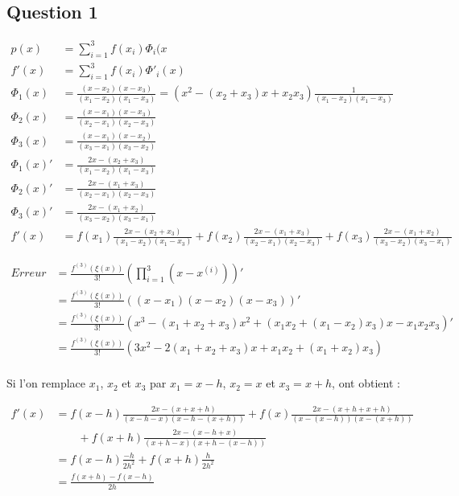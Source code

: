 \subsection{Question 1}

\begin{equation}
	\begin{aligned}
		p(x) &= \sum_{i=1}^{3}f(x_i)\Phi_i(x\\
		f'(x) &= \sum_{i=1}^{3}f(x_i)\Phi'_i(x)\\
		\Phi_1(x) &= \frac{(x-x_2)(x-x_3)}{(x_1-x_2)(x_1-x_3)} = (x^2 - (x_2+x_3)x+x_2x_3)\frac{1}{(x_1-x_2)(x_1-x_3)}\\
		\Phi_2(x) &= \frac{(x-x_1)(x-x_3)}{(x_2-x_1)(x_2-x_3)}\\
		\Phi_3(x) &= \frac{(x-x_1)(x-x_2)}{(x_3-x_1)(x_3-x_2)}\\
		\Phi_1(x)' &= \frac{2x - (x_2+x_3)}{(x_1-x_2)(x_1-x_3)}\\
		\Phi_2(x)' &= \frac{2x - (x_1+x_3)}{(x_2-x_1)(x_2-x_3)}\\
		\Phi_3(x)' &= \frac{2x - (x_1+x_2)}{(x_3-x_2)(x_3-x_1)}\\
		f'(x) &= f(x_1)\frac{2x - (x_2+x_3)}{(x_1-x_2)(x_1-x_3)} + f(x_2)\frac{2x - (x_1+x_3)}{(x_2-x_1)(x_2-x_3)}+f(x_3)\frac{2x - (x_1+x_2)}{(x_3-x_2)(x_3-x_1)}
	\end{aligned}
\end{equation}

\begin{equation}
	\begin{aligned}
		Erreur &= \frac{f^{(3)}(\xi(x))}{3!}(\prod_{i=1}^{3}(x - x^{(i)}))'\\
		&= \frac{f^{(3)}(\xi(x))}{3!}((x-x_1)(x-x_2)(x-x_3))'\\
		&= \frac{f^{(3)}(\xi(x))}{3!}(x^3-(x_1+x_2+x_3)x^2 + (x_1x_2+(x_1-x_2)x_3)x-x_1x_2x_3)'\\
		&= \frac{f^{(3)}(\xi(x))}{3!}(3x^2 - 2(x_1+x_2+x_3)x + x_1x_2+(x_1+x_2)x_3)\\
	\end{aligned}
\end{equation}

Si l'on remplace $x_1$, $x_2$ et $x_3$ par $x_1 = x-h$, $x_2 = x$ et $x_3 = x + h$, ont obtient :

\begin{equation}
	\begin{aligned}
		f'(x) &= f(x-h)\frac{2x - (x+x+h)}{(x-h-x)(x-h-(x+h))} + f(x)\frac{2x - (x+h+x+h)}{(x-(x-h))(x-(x+h))}\\&\qquad+f(x+h)\frac{2x - (x-h+x)}{(x+h-x)(x+h-(x-h))}\\
		&= f(x-h)\frac{-h}{2h^2} + f(x+h)\frac{h}{2h^2}\\
		&= \frac{f(x+h)-f(x-h)}{2h}
	\end{aligned}
\end{equation}


